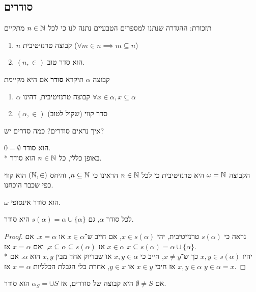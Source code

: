 \subsection{סודרים}
תזכורת: ההגדרה שנתנו למספרים הטבעיים נתנה לנו כי לכל $n \in \mathbb{N}$ מתקיים
\begin{enumerate}
	\item $n$ קבוצה טרנזיטיבית ($\forall m \in n \implies m \subseteq n$)
	\item $(n, \in)$ הוא סדר טוב.
\end{enumerate}
\begin{definition}[סודר]
	קבוצה $\alpha$ תיקרא \textbf{סודר} אם היא מקיימת
	\begin{enumerate}
		\item $\alpha$ קבוצה טרנזיטיבית, דהינו $\forall x \in \alpha, x \subseteq \alpha$
		\item $(\alpha, \in)$ סדר קווי (שקול לטוב)
	\end{enumerate}
\end{definition}
\begin{exercise}
	איך נראים סודרים? כמה סדרים יש?
\end{exercise}
\begin{example}
	$0 = \emptyset$ הוא סודר. \\*
	באופן כללי, כל $n \in \mathbb{N}$ הוא סודר.
\end{example}
\begin{example}
	הקבוצה $\omega = \mathbb{N}$ היא טרנזיטיבית כי לכל $n \in \mathbb{N}$ הראינו כי $n \subseteq \mathbb{N}$, והיחס $(\mathbb{N}, \in)$ הוא קווי כפי שכבר הוכחנו.
\end{example}
\begin{conclusion}
	$\omega$ הוא סודר אינסופי.
\end{conclusion}
\begin{proposition}
	לכל סודר $\alpha$, גם $s(\alpha) = \alpha \cup \{ \alpha \}$ היא סודר.
\end{proposition}
\begin{proof}
	נראה כי $s(\alpha)$ טרנזיטיבית, יהי $x \in s(\alpha)$, אם חייב ש־$x \in \alpha$ או $x = \alpha$.
	אם $x \in \alpha$ אז $x \subseteq \alpha \subseteq s(\alpha)$, ואם $x = \alpha$ אז $x \subseteq s(\alpha) = \alpha \cup \{ \alpha \}$. \\*
	יהיו $x, y \in s(\alpha)$ כך ש־$x \ne y$, חייב כי $x, y \in \alpha$ או שבדיוק אחד מבין $x, y$ הוא $\alpha$.
	אם $x, y \in \alpha$ אז חיבי $x \in y$ או $y \in x$, אחרת בלי הגבלת הכלליות $x = \alpha$ אז $y \in \alpha = x$.
\end{proof}
\begin{proposition}
	אם $\emptyset \ne S$ היא קבוצה של סודרים, אז $\alpha_S = \cup S$ הוא סודר.
\end{proposition}


